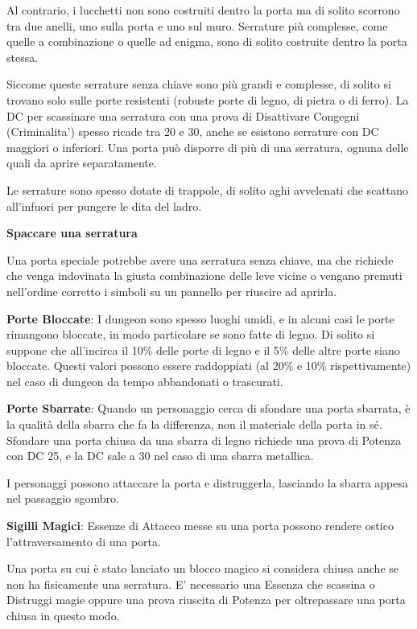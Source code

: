 \documentclass[a4paper,11pt,twoside,openany]{book}
\begin{document}
Al contrario, i lucchetti non sono costruiti dentro la porta ma di solito scorrono tra due anelli, uno sulla porta e uno sul muro. Serrature più complesse, come quelle a combinazione o quelle ad enigma, sono di solito costruite dentro la porta stessa.

Siccome queste serrature senza chiave sono più grandi e complesse, di solito si trovano solo sulle porte resistenti (robuste porte di legno, di pietra o di ferro).
La DC per scassinare una serratura con una prova di Disattivare Congegni (Criminalita') spesso ricade tra 20 e 30, anche se esistono serrature con DC maggiori o inferiori. Una porta può disporre di più di una serratura, ognuna delle quali da aprire separatamente.

Le serrature sono spesso dotate di trappole, di solito aghi avvelenati che scattano all'infuori per pungere le dita del ladro.

\textbf{Spaccare una serratura}

Una porta speciale potrebbe avere una serratura senza chiave, ma che richiede che venga indovinata la giusta combinazione delle leve vicine o vengano premuti nell'ordine corretto i simboli su un pannello per riuscire ad aprirla.

\textbf{Porte Bloccate}: I dungeon sono spesso luoghi umidi, e in alcuni casi le porte rimangono bloccate, in modo particolare se sono fatte di legno. Di solito si suppone che all'incirca il 10\% delle porte di legno e il 5\% delle altre porte siano bloccate. Questi valori possono essere raddoppiati (al 20\% e 10\% rispettivamente) nel caso di dungeon da tempo abbandonati o trascurati.

\textbf{Porte Sbarrate}: Quando un personaggio cerca di sfondare una porta sbarrata, è la qualità della sbarra che fa la differenza, non il materiale della porta in sé. Sfondare una porta chiusa da una sbarra di legno richiede una prova di Potenza con DC 25, e la DC sale a 30 nel caso di una sbarra metallica.

I personaggi possono attaccare la porta e distruggerla, lasciando la sbarra appesa nel passaggio sgombro.

\textbf{Sigilli Magici}: Essenze di Attacco messe su una porta possono rendere ostico l'attraversamento di una porta.

Una porta su cui è stato lanciato un blocco magico si considera chiusa anche se non ha fisicamente una serratura. E' necessario una Essenza che scassina o Distruggi magie oppure una prova riuscita di Potenza per oltrepassare una porta chiusa in questo modo.
\end{document}
